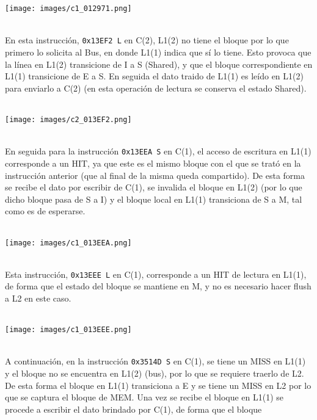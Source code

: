 \documentclass {article}
\begin{document}
\\
\\
\begin{centering} \texttt{[image: images/c1\_012971.png]} \end{centering}
\\
En esta instrucción, \texttt{0x13EF2 L} en C(2), L1(2) no tiene el bloque por lo que primero lo solicita al
Bus, en donde L1(1) indica que sí lo tiene. Esto provoca que la línea en L1(2) transicione de I a S
(Shared), y que el bloque correspondiente en L1(1) transicione de E a S. En seguida el dato traido
de L1(1) es leído en L1(2) para enviarlo a C(2) (en esta operación de lectura se conserva el estado
Shared).
\\
\\
\begin{centering} \texttt{[image: images/c2\_013EF2.png]} \end{centering}
\\
En seguida para la instrucción \texttt{0x13EEA S} en C(1), el acceso de escritura en L1(1)
corresponde a un HIT, ya que este es el mismo bloque con el que se trató en la instrucción anterior
(que al final de la misma queda compartido). De esta forma se recibe el dato por escribir de C(1),
se invalida el bloque en L1(2) (por lo que dicho bloque pasa de S a I) y el bloque local en L1(1)
transiciona de S a M, tal como es de esperarse.
\\
\\
\begin{centering} \texttt{[image: images/c1\_013EEA.png]} \end{centering}
\\
Esta instrucción, \texttt{0x13EEE L} en C(1), corresponde a un HIT de lectura en L1(1), de forma que
el estado del bloque se mantiene en M, y no es necesario hacer flush a L2 en este caso.
\\
\\
\begin{centering} \texttt{[image: images/c1\_013EEE.png]} \end{centering}
\\
A continuación, en la instrucción \texttt{0x3514D S} en C(1), se tiene un MISS en L1(1) y el bloque
no se encuentra en L1(2) (bus), por lo que se requiere traerlo de L2. De esta forma el bloque en
L1(1) transiciona a E y se tiene un MISS en L2 por lo que se captura el bloque de MEM. Una vez se
recibe el bloque en L1(1) se procede a escribir el dato brindado por C(1), de forma que el bloque
\end{document}
